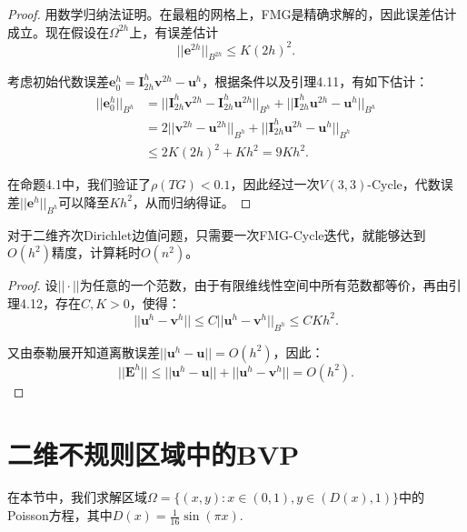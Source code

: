 \documentclass[lang=cn,10pt]{elegantbook}
\begin{document}
\begin{proof}
  用数学归纳法证明。在最粗的网格上，FMG是精确求解的，因此误差估计成立。现在假设在$\Omega^{2h}$上，有误差估计
  \begin{equation*}
    ||\mathbf{e}^{2h}||_{B^{2h}}\leq K(2h)^2.
  \end{equation*}

  考虑初始代数误差$\mathbf{e}_0^h=\mathbf{I}_{2h}^h\mathbf{v}^{2h}-\mathbf{u}^h$，根据条件以及引理4.11，有如下估计：
  \begin{align*}
    ||\mathbf{e}_0^h||_{B^h}&=||\mathbf{I}_{2h}^h\mathbf{v}^{2h}-\mathbf{I}_{2h}^h\mathbf{u}^{2h}||_{B^h}+||\mathbf{I}_{2h}^h\mathbf{u}^{2h}-\mathbf{u}^h||_{B^h}\\
    &=2||\mathbf{v}^{2h}-\mathbf{u}^{2h}||_{B^h}+||\mathbf{I}_{2h}^h\mathbf{u}^{2h}-\mathbf{u}^h||_{B^h}\\
    &\leq 2K(2h)^2+Kh^2=9Kh^2.
  \end{align*}

  在命题4.1中，我们验证了$\rho(TG)<0.1$，因此经过一次$V(3,3)$-Cycle，代数误差$||\mathbf{e}^h||_{B^h}$可以降至$Kh^2$，从而归纳得证。
\end{proof}

\begin{theorem}
  对于二维齐次Dirichlet边值问题，只需要一次FMG-Cycle迭代，就能够达到$O(h^2)$精度，计算耗时$O(n^2)$。
\end{theorem}

\begin{proof}
  设$||\cdot||$为任意的一个范数，由于有限维线性空间中所有范数都等价，再由引理4.12，存在$C,K>0$，使得：
  \begin{equation*}
    ||\mathbf{u}^h-\mathbf{v}^h||\leq C||\mathbf{u}^h-\mathbf{v}^h||_{B^h}\leq CKh^2.
  \end{equation*}

  又由泰勒展开知道离散误差$||\mathbf{u}^h-\mathbf{u}||=O(h^2)$，因此：
  \begin{equation*}
    ||\mathbf{E}^h||\leq ||\mathbf{u}^h-\mathbf{u}||+||\mathbf{u}^h-\mathbf{v}^h||=O(h^2).
  \end{equation*}
\end{proof}

\newpage

\chapter{二维不规则区域中的BVP}

在本节中，我们求解区域$\Omega=\{(x,y):x\in(0,1),y\in(D(x),1)\}$中的Poisson方程，其中$D(x)=\frac{1}{16}\sin(\pi x).$
\end{document}
